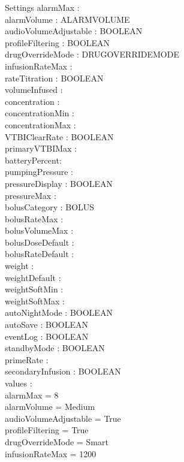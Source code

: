 \begin{schema}{Settings}
	alarmMax : \nat\\
	alarmVolume : ALARMVOLUME\\
	audioVolumeAdjustable : BOOLEAN\\
	profileFiltering : BOOLEAN\\
	drugOverrideMode : DRUGOVERRIDEMODE\\
	infusionRateMax : \nat\\
	rateTitration : BOOLEAN\\
	volumeInfused : \nat\\
	concentration : \nat\\
	concentrationMin : \nat\\
	concentrationMax : \nat\\
	VTBIClearRate : BOOLEAN\\
	primaryVTBIMax : \nat\\
	batteryPercent: \nat\\
	pumpingPressure : \nat\\
	pressureDisplay : BOOLEAN\\
	pressureMax : \nat\\
	bolusCategory : BOLUS\\
	bolusRateMax : \nat\\
	bolusVolumeMax : \nat\\
	\pagebreak
	bolusDoseDefault : \nat\\
	bolusRateDefault : \nat\\
	weight : \nat\\
	weightDefault : \nat\\
	weightSoftMin : \nat\\
	weightSoftMax : \nat\\
	autoNightMode : BOOLEAN\\
	autoSave : BOOLEAN\\
	eventLog : BOOLEAN\\
	standbyMode : BOOLEAN\\
	primeRate : \nat\\
	secondaryInfusion : BOOLEAN\\
	values : \nat \rel \nat\\
	\where
	alarmMax = 8\\
	alarmVolume = Medium\\
	audioVolumeAdjustable = True\\
	profileFiltering = True\\
	drugOverrideMode = Smart\\
	infusionRateMax = 1200\\

\end{schema}
